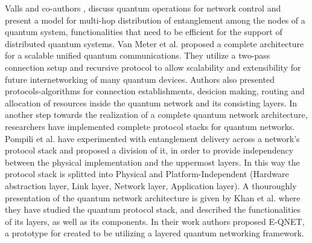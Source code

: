 \documentclass[12pt]{ieeetj}
\begin{document}
		Valls and co-authors \cite{brief-intro}, discuss quantum operations for network
		control and present a model for multi-hop distribution of entanglement among the nodes of
		a quantum system, functionalities that need to be efficient for the support of distributed
		quantum systems.
		Van Meter et al. \cite{quantum-arch} proposed a complete architecture 
		for a scalable unified quantum communications. They utilize a two-pass connection setup and recursive protocol
		to allow scalability and extensibility for future internetworking
		of many quantum devices. Authors also presented protocols-algorithms for connection establishments, desicion making, routing and 
		allocation of resources inside the quantum network and its consisting layers.
		In another step towards the realization of a complete quantum network architecture,
		researchers have implemented complete protocol stacks for quantum networks.
		Pompili et al. \cite{pompilli} have experimented with entanglement delivery across 
		a network's protocol stack and proposed a division of it, in order to provide 
		independency between the physical implementation and the uppermost layers. 
		In this way the protocol stack is splitted into Physical and Platform-Independent
		(Hardware abstraction layer, Link layer, Network layer, Application layer).
		A thouroughly presentation of the quantum network architecture is given by Khan et al. \cite{e-qnet}
		where they have studied the quantum protocol stack, and described the functionalities of its layers, as well 
		as its components. In their work authors proposed E-QNET, a prototype for  created to be utilizing a layered quantum networking
		framework.
		
		
\end{document}
